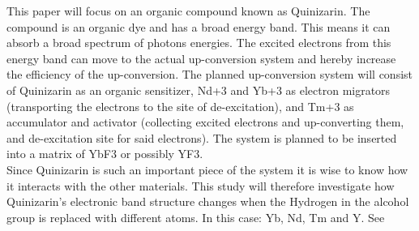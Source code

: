\documentclass{article}
\begin{document}
    This paper will focus on an organic compound known as Quinizarin. The compound is an organic dye and has a broad energy band. This means it can absorb a broad spectrum of photons energies. The excited electrons from this energy band can move to the actual up-conversion system and hereby increase the efficiency of the up-conversion. The planned up-conversion system will consist of Quinizarin as an organic sensitizer, Nd+3 and Yb+3 as electron migrators (transporting the electrons to the site of de-excitation), and Tm+3 as accumulator and activator (collecting excited electrons and up-converting them, and de-excitation site for said electrons). The system is planned to be inserted into a matrix of YbF3 or possibly YF3.\\

    Since Quinizarin is such an important piece of the system it is wise to know how it interacts with the other materials. This study will therefore investigate how Quinizarin's electronic band structure changes when the Hydrogen in the alcohol group is replaced with different atoms. In this case: Yb, Nd, Tm and Y. See %

\end{document}
